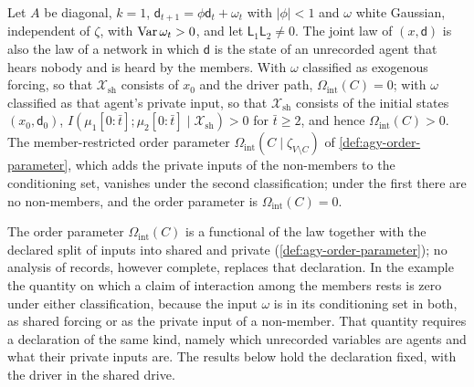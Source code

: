 \begin{proposition}\label{prop:idn-relabel}
Let $A$ be diagonal, $k=1$, $\mathsf d_{t+1}=\phi\mathsf d_t+\omega_t$ with $|\phi|<1$ and $\omega$ white Gaussian, independent of $\zeta$, with $\operatorname{Var}\omega_t>0$, and let $\mathsf L_1\mathsf L_2\neq0$. The joint law of $(x,\mathsf d)$ is also the law of a network in which $\mathsf d$ is the state of an unrecorded agent that hears nobody and is heard by the members. With $\omega$ classified as exogenous forcing, so that $\mathcal X_{\mathrm{sh}}$ consists of $x_0$ and the driver path, $\Omega_{\mathrm{int}}(C)=0$; with $\omega$ classified as that agent's private input, so that $\mathcal X_{\mathrm{sh}}$ consists of the initial states $(x_0,\mathsf d_0)$, $I(\mu_1[0{:}\bar t];\mu_2[0{:}\bar t]\mid\mathcal X_{\mathrm{sh}})>0$ for $\bar t\ge2$, and hence $\Omega_{\mathrm{int}}(C)>0$. The member-restricted order parameter $\Omega_{\mathrm{int}}(C\mid\zeta_{V\setminus C})$ of \cref{def:agy-order-parameter}, which adds the private inputs of the non-members to the conditioning set, vanishes under the second classification; under the first there are no non-members, and the order parameter is $\Omega_{\mathrm{int}}(C)=0$.
\end{proposition}

The order parameter $\Omega_{\mathrm{int}}(C)$ is a functional of the law together with the declared split of inputs into shared and private (\cref{def:agy-order-parameter}); no analysis of records, however complete, replaces that declaration. In the example the quantity on which a claim of interaction among the members rests is zero under either classification, because the input $\omega$ is in its conditioning set in both, as shared forcing or as the private input of a non-member. That quantity requires a declaration of the same kind, namely which unrecorded variables are agents and what their private inputs are. The results below hold the declaration fixed, with the driver in the shared drive.

